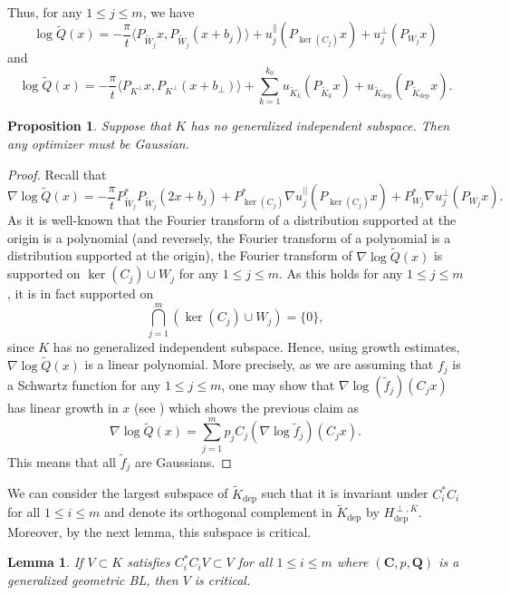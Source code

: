 \documentclass[11pt,a4paper,reqno]{amsart}
\numberwithin{equation}{section}
\newtheorem{lemma}[theorem]{Lemma}
\newtheorem{proposition}[theorem]{Proposition}
\theoremstyle{definition}
\renewcommand{\tilde}{\widetilde}
\newcommand{\<}{\ensuremath \leq}
\renewcommand{\>}{\ensuremath \geq}
\renewcommand{\tilde}{\widetilde}
\begin{document}
\hfill \\ Thus, for any $1 \leq j \leq m$, we have $$\log \tilde Q(x)=-\frac{\pi}{t} \langle P_{\tilde W_j}x,P_{\tilde W_j}(x+b_j)\rangle+u_j^{\parallel}(P_{\ker(C_j)}x)+u_j^\perp(P_{W_j}x)$$ 
and
$$\log \tilde Q(x)=-\frac{\pi}{t} \langle P_{K^\perp}x,P_{K^\perp}(x+b_\perp)\rangle+\sum_{k=1}^{k_0}u_{\tilde K_k}(P_{\tilde K_k}x)+u_{\tilde K_{\mathrm{dep}}}({P_{\tilde K_{\mathrm{dep}}}}x).$$ 





\begin{proposition}
    Suppose that $K$ has no generalized independent subspace. Then any optimizer must be Gaussian. 
\end{proposition}

\begin{proof}
Recall that
    $$\nabla \log \tilde Q(x)=-\frac{\pi}{t} P_{\tilde W_j}^*P_{\tilde W_j}(2x+b_j)+P_{\ker(C_j)}^*\nabla u_j^{||}(P_{\ker(C_j)}x)+P_{W_j}^*\nabla u_j^\perp(P_{W_j}x).$$ As it is well-known that the Fourier transform of a distribution supported at the origin is a polynomial (and reversely, the Fourier transform of a polynomial is a distribution supported at the origin), the Fourier transform of $\nabla \log \tilde Q(x)$ is supported on $\ker(C_j) \cup W_j$ for any $1 \leq j \leq m.$ As this holds for any $1 \leq j \leq m$, it is in fact supported on $$\bigcap_{j=1}^m (\ker(C_j) \cup W_j)=\{0\},$$ since $K$ has no generalized independent subspace. Hence, using growth estimates, $\nabla \log \tilde Q(x)$ is a linear polynomial. More precisely, as we are assuming that $f_j$ is a Schwartz function for any $1 \leq j \leq m$, one may show that $\nabla \log(\tilde f_j)(C_jx)$ has linear growth in $x$ (see \cite[Lemma 5]{Vald2}) which shows the previous claim as $$\nabla \log \tilde Q(x)=\sum_{j=1}^m p_jC_j(\nabla \log \tilde f_j)(C_jx).$$ This means that all $\tilde f_j$ are Gaussians. 
\end{proof} 


We can consider the largest subspace of $\tilde K_{\mathrm{dep}}$ such that it is invariant under $C_i^*C_i$ for all $1 \leq i \leq m$ and denote its orthogonal complement in $\tilde K_{\mathrm{dep}}$ by $H_{\mathrm{dep}}^{\perp,K}.$ Moreover, by the next lemma, this subspace is critical. 

\begin{lemma} \label{Commuting_implies_critical}
    If $V \subset K$ satisfies $C_i^*C_iV \subset V$ for all $1 \leq i \leq m$ where $(\textbf{C},p,\textbf{Q})$ is a generalized geometric BL, then $V$ is critical.
\end{lemma}
\end{document}
